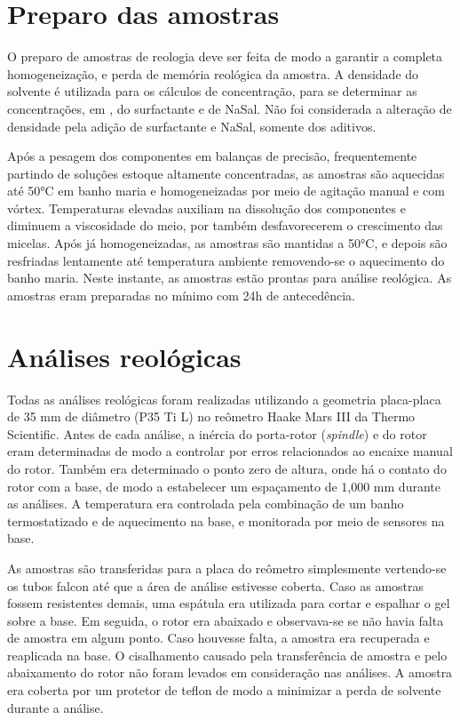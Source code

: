 		\section{Preparo das amostras}
		\label{sec:reologia_preparo_amostra}
		O preparo de amostras de reologia deve ser feita de modo a garantir a completa homogeneização, e perda de memória reológica da amostra. A densidade do solvente é utilizada para os cálculos de concentração, para se determinar as concentrações, em \mM, do surfactante e de NaSal. Não foi considerada a alteração de densidade pela adição de surfactante e NaSal, somente dos aditivos.
		
		Após a pesagem dos componentes em balanças de precisão, frequentemente partindo de soluções estoque altamente concentradas, as amostras são aquecidas até 50°C em banho maria e homogeneizadas por meio de agitação manual e com vórtex. Temperaturas elevadas auxiliam na dissolução dos componentes e diminuem a viscosidade do meio, por também desfavorecerem o crescimento das micelas. Após já homogeneizadas, as amostras são mantidas a 50°C, e depois são resfriadas lentamente até temperatura ambiente removendo-se o aquecimento do banho maria. Neste instante, as amostras estão prontas para análise reológica. As amostras eram preparadas no mínimo com 24h de antecedência.
		
		\section{Análises reológicas}

		Todas as análises reológicas foram realizadas utilizando a geometria placa-placa de 35 mm de diâmetro (P35 Ti L) no reômetro Haake Mars III da Thermo Scientific. Antes de cada análise, a inércia do porta-rotor (\emph{spindle}) e do rotor eram determinadas de modo a controlar por erros relacionados ao encaixe manual do rotor. Também era determinado o ponto zero de altura, onde há o contato do rotor com a base, de modo a estabelecer um espaçamento de 1,000 mm durante as análises. A temperatura era controlada pela combinação de um banho termostatizado e de aquecimento na base, e monitorada por meio de sensores na base.
		
		As amostras são transferidas para a placa do reômetro simplesmente vertendo-se os tubos falcon até que a área de análise estivesse coberta. Caso as amostras fossem resistentes demais, uma espátula era utilizada para cortar e espalhar o gel sobre a base. Em seguida, o rotor era abaixado e observava-se se não havia falta de amostra em algum ponto. Caso houvesse falta, a amostra era recuperada e reaplicada na base. O cisalhamento causado pela transferência de amostra e pelo abaixamento do rotor não foram levados em consideração nas análises. A amostra era coberta por um protetor de teflon de modo a minimizar a perda de solvente durante a análise.
		

